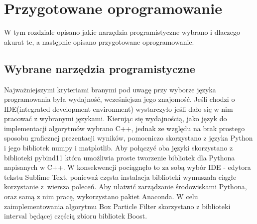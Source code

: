 \chapter{Przygotowane oprogramowanie}
W tym rozdziale opisano jakie narzędzia programistyczne wybrano i dlaczego akurat te, a następnie opisano przygotowane oprogramowanie.
\section{Wybrane narzędzia programistyczne}
Najważniejszymi kryteriami branymi pod uwagę przy wyborze języka programowania była wydajność, wcześniejsza jego znajomość. Jeśli chodzi o IDE(integrated development environment) wystarczyło jeśli dało się w nim pracować z wybranymi językami. Kierując się wydajnością, jako język do implementacji algorytmów wybrano C++, jednak ze względu na brak prostego sposobu graficznej prezentacji wyników, pomocniczo skorzystano z języka Python i jego bibliotek numpy\cite{numpy} i matplotlib\cite{matplotlib}. Aby połączyć oba języki skorzystano z biblioteki pybind11\cite{pybind11} która umożliwia proste tworzenie bibliotek dla Pythona napisanych w C++. W konsekwencji pociągnęło to za sobą wybór IDE - edytora tekstu Sublime Text\cite{sublime}, ponieważ częsta instalacja biblioteki wymuszała ciągłe korzystanie z~wiersza poleceń. Aby ułatwić zarządzanie środowiskami Pythona, oraz samą z nim pracę, wykorzystano pakiet Anaconda\cite{anaconda}. W celu zaimplementowania algorytmu Box Particle Filter skorzystano z biblioteki interval będącej częścią zbioru bibliotek Boost\cite{boost_int}.
